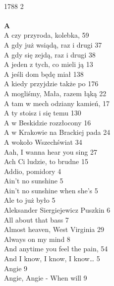 \documentclass[a5paper, 10pt]{book}
\begin{document}


\newpage
{\scriptsize
  \begin{multicols}{3}
    ~\\
    1788 2\\
    \\
    {\footnotesize \textbf{A\\} }
    A czy przyroda, kolebka, 59\\
    A gdy już wsiądą, raz i drugi 37\\
    A gdy się zejdą, raz i drugi 38\\
    A jeden z tych, co mieli ją 13\\
    A jeśli dom będę miał 138\\
    A kiedy przyjdzie także po 176\\
    A mogliśmy, Mała, razem łąką 22\\
    A tam w mech odziany kamień, 17\\
    A ty stoisz i się temu 130\\
    A w Beskidzie rozzłocony 16\\
    A w Krakowie na Brackiej pada 24\\
    A wokoło Wszechświat 34\\
    Aah, I wanna hear you sing 27\\
    Ach Ci ludzie, to brudne 15\\
    Addio, pomidory 4\\
    Ain't no sunshine 5\\
    Ain't no sunshine when she's 5\\
    Ale to już było 5\\
    Aleksander Siergiejewicz Puszkin 6\\
    All about that bass 7\\
    Almost heaven, West Virginia 29\\
    Always on my mind 8\\
    And anytime you feel the pain, 54\\
    And I know, I know, I know… 5\\
    Angie 9\\
    Angie, Angie - When will 9\\

\end{multicols}}
\end{document}
